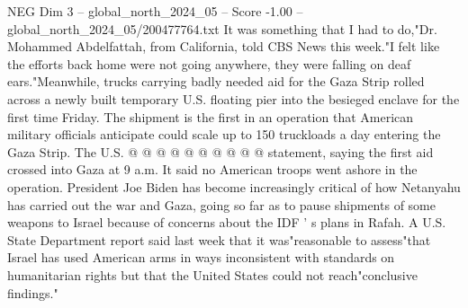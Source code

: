 \begin{textsample}{NEG Dim 3 – global\_north\_2024\_05 – Score -1.00 – global\_north\_2024\_05/200477764.txt}
It was something that I had to do,"Dr.
Mohammed Abdelfattah, from California, told CBS News this week."I felt like the efforts back home were not going anywhere, they were falling on deaf ears."Meanwhile, trucks carrying badly needed aid for the Gaza Strip rolled across a newly built temporary U.S. floating pier into the besieged enclave for the first time Friday.
The shipment is the first in an operation that American military officials anticipate could scale up to 150 truckloads a day entering the Gaza Strip.
The U.S. @ @ @ @ @ @ @ @ @ @ statement, saying the first aid crossed into Gaza at 9 a.m.
It said no American troops went ashore in the operation.
President Joe Biden has become increasingly critical of how Netanyahu has carried out the war and Gaza, going so far as to pause shipments of some weapons to Israel because of concerns about the IDF ' s plans in Rafah.
A U.S.
State Department report said last week that it was"reasonable to assess"that Israel has used American arms in ways inconsistent with standards on humanitarian rights but that the United States could not reach"conclusive findings."

\end{textsample}
